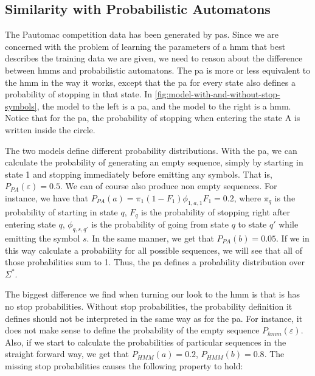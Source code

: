 \subsection{Similarity with Probabilistic Automatons}
The Pautomac competition data has been generated by \gls{pa}s. Since we are concerned with the problem of learning the parameters of a \gls{hmm} that best describes the training data we are given, we need to reason about the difference between \gls{hmm}s and probabilistic automatons. The \gls{pa} is more or less equivalent to the \gls{hmm} in the way it works, except that the \gls{pa} for every state also defines a probability of stopping in that state.
In \ref{fig:model-with-and-without-stop-symbols}, the model to the left is a \gls{pa}, and the model to the right is a \gls{hmm}.
Notice that for the \gls{pa}, the probability of stopping when entering the state A is written inside the circle.



The two models define different probability distributions.
With the \gls{pa}, we can calculate the probability of generating an empty sequence, simply by starting in state 1 and stopping immediately before emitting any symbols. That is, $P_{PA}(\varepsilon) = 0.5$. We can of course also produce non empty sequences. For instance, we have that $P_{PA}(a) = \pi_1(1-F_1)\phi_{1,a,1}F_1 = 0.2$, where $\pi_q$ is the probability of starting in state $q$, $F_q$ is the probability of stopping right after entering state $q$, $\phi_{q,s,q'}$ is the probability of going from state $q$ to state $q'$ while emitting the symbol $s$.
In the same manner, we get that $P_{PA}(b) = 0.05$.
If we in this way calculate a probability for all possible sequences, we will see that all of those probabilities sum to 1. Thus, the \gls{pa} defines a probability distribution over $\Sigma^\ast$\cite{Dupont:2005:LPA:1746577.1746601}.

The biggest difference we find when turning our look to the \gls{hmm} is that is has no stop probabilities.
Without stop probabilities, the probability definition it defines should not be interpreted in the same way as for the \gls{pa}. For instance, it does not make sense to define the probability of the empty sequence $P_{hmm}(\varepsilon)$. Also, if we start to calculate the probabilities of particular sequences in the straight forward way, we get that $P_{HMM}(a) = 0.2$, $P_{HMM}(b) = 0.8$. The missing stop probabilities causes the following property to hold:

